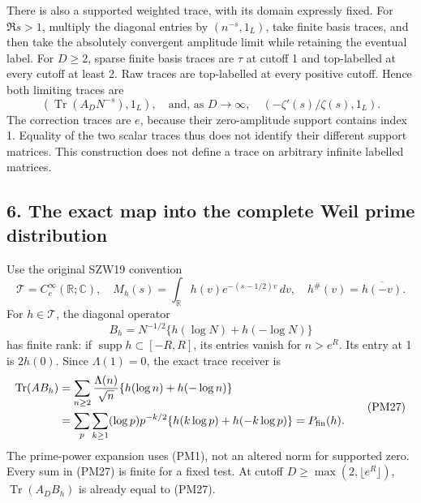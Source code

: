 \documentclass[
  10pt,
  a4paper,
]{article}
\begin{document}
There is also a supported weighted trace, with its domain expressly
fixed. For \(\Re s>1\), multiply the diagonal entries by
\((n^{-s},1_L)\), take finite basis traces, and then take the absolutely
convergent amplitude limit while retaining the eventual label. For
\(D\ge2\), sparse finite basis traces are \(\tau\) at cutoff 1 and
top-labelled at every cutoff at least 2. Raw traces are top-labelled at
every positive cutoff. Hence both limiting traces are \[
\left(\operatorname{Tr}(A_DN^{-s}),1_L\right),
\quad\text{and, as }D\to\infty,\quad
\left(-\zeta'(s)/\zeta(s),1_L\right).
\tag{PM24}
\] The correction traces are \(e\), because their zero-amplitude support
contains index 1. Equality of the two scalar traces thus does not
identify their different support matrices. This construction does not
define a trace on arbitrary infinite labelled matrices.

\subsection{6. The exact map into the complete Weil prime
distribution}\label{the-exact-map-into-the-complete-weil-prime-distribution}

Use the original SZW19 convention \[
\mathcal T=C_c^\infty(\mathbb R;\mathbb C),\quad
M_h(s)=\int_{\mathbb R}h(v)e^{-(s-1/2)v}\,dv,
\quad h^\#(v)=\overline{h(-v)}.
\tag{PM25}
\] For \(h\in\mathcal T\), the diagonal operator \[
B_h=N^{-1/2}\{h(\log N)+h(-\log N)\}
\tag{PM26}
\] has finite rank: if \(\operatorname{supp}h\subset[-R,R]\), its
entries vanish for \(n>e^R\). Its entry at 1 is \(2h(0)\). Since
\(\Lambda(1)=0\), the exact trace receiver is \[
\begin{split}
\operatorname{Tr}(AB_h)
&=\sum_{n\ge2}\frac{\Lambda(n)}{\sqrt n}
\{h(\log n)+h(-\log n)\}\\
&=\sum_p\sum_{k\ge1}(\log p)p^{-k/2}
\{h(k\log p)+h(-k\log p)\}
=P_{\rm fin}(h).
\end{split}
\tag{PM27}
\] The prime-power expansion uses (PM1), not an altered norm for
supported zero. Every sum in (PM27) is finite for a fixed test. At
cutoff \(D\ge\max(2,\lfloor e^R\rfloor)\), \(\operatorname{Tr}(A_DB_h)\)
is already equal to (PM27).
\end{document}
